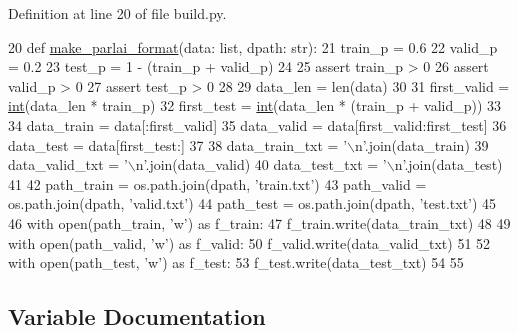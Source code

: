 Definition at line 20 of file build.\+py.


\begin{DoxyCode}
20 \textcolor{keyword}{def }\hyperlink{namespaceparlai_1_1tasks_1_1quac_1_1build_a08c212462b5c58cde91192d35f24f0cc}{make\_parlai\_format}(data: list, dpath: str):
21     train\_p = 0.6
22     valid\_p = 0.2
23     test\_p = 1 - (train\_p + valid\_p)
24 
25     \textcolor{keyword}{assert} train\_p > 0
26     \textcolor{keyword}{assert} valid\_p > 0
27     \textcolor{keyword}{assert} test\_p > 0
28 
29     data\_len = len(data)
30 
31     first\_valid = \hyperlink{namespacelanguage__model_1_1eval__ppl_a7d12ee00479673c5c8d1f6d01faa272a}{int}(data\_len * train\_p)
32     first\_test = \hyperlink{namespacelanguage__model_1_1eval__ppl_a7d12ee00479673c5c8d1f6d01faa272a}{int}(data\_len * (train\_p + valid\_p))
33 
34     data\_train = data[:first\_valid]
35     data\_valid = data[first\_valid:first\_test]
36     data\_test = data[first\_test:]
37 
38     data\_train\_txt = \textcolor{stringliteral}{'\(\backslash\)n'}.join(data\_train)
39     data\_valid\_txt = \textcolor{stringliteral}{'\(\backslash\)n'}.join(data\_valid)
40     data\_test\_txt = \textcolor{stringliteral}{'\(\backslash\)n'}.join(data\_test)
41 
42     path\_train = os.path.join(dpath, \textcolor{stringliteral}{'train.txt'})
43     path\_valid = os.path.join(dpath, \textcolor{stringliteral}{'valid.txt'})
44     path\_test = os.path.join(dpath, \textcolor{stringliteral}{'test.txt'})
45 
46     with open(path\_train, \textcolor{stringliteral}{'w'}) \textcolor{keyword}{as} f\_train:
47         f\_train.write(data\_train\_txt)
48 
49     with open(path\_valid, \textcolor{stringliteral}{'w'}) \textcolor{keyword}{as} f\_valid:
50         f\_valid.write(data\_valid\_txt)
51 
52     with open(path\_test, \textcolor{stringliteral}{'w'}) \textcolor{keyword}{as} f\_test:
53         f\_test.write(data\_test\_txt)
54 
55 
\end{DoxyCode}


\subsection{Variable Documentation}
\mbox{\label{namespaceparlai_1_1tasks_1_1convai2__wild__evaluation_1_1build_abdb1e0f90d76cfd525e4ef8f8e610839}} 
